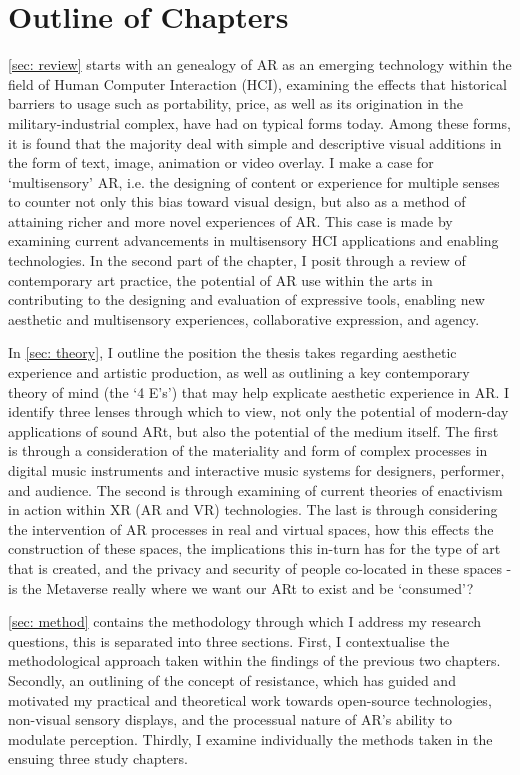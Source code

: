 \section{Outline of Chapters}\label{sec: introduction-outline}
\autoref{sec: review} starts with an genealogy of AR as an emerging technology within the field of Human Computer Interaction (HCI), examining the effects that historical barriers to usage such as portability, price, as well as its origination in the military-industrial complex, have had on typical forms today. Among these forms, it is found that the majority deal with simple and descriptive visual additions in the form of text, image, animation or video overlay. I make a case for `multisensory' AR, i.e. the designing of content or experience for multiple senses to counter not only this bias toward visual design, but also as a method of attaining richer and more novel experiences of AR. This case is made by examining current advancements in multisensory HCI applications and enabling technologies. In the second part of the chapter, I posit through a review of contemporary art practice, the potential of AR use within the arts in contributing to the designing and evaluation of expressive tools, enabling new aesthetic and multisensory experiences, collaborative expression, and agency.

In \autoref{sec: theory}, I outline the position the thesis takes regarding aesthetic experience and artistic production, as well as outlining a key contemporary theory of mind (the `4 E's') that may help explicate aesthetic experience in AR. I identify three lenses through which to view, not only the potential of modern-day applications of sound ARt, but also the potential of the medium itself. The first is through a consideration of the materiality and form of complex processes in digital music instruments and interactive music systems for designers, performer, and audience. The second is through examining of current theories of enactivism in action within XR (AR and VR) technologies. The last is through considering the intervention of AR processes in real and virtual spaces, how this effects the construction of these spaces, the implications this in-turn has for the type of art that is created, and the privacy and security of people co-located in these spaces - is the Metaverse really where we want our ARt to exist and be `consumed'? 

\autoref{sec: method} contains the methodology through which I address my research questions, this is separated into three sections. First, I contextualise the methodological approach taken within the findings of the previous two chapters. Secondly, an outlining of the concept of resistance, which has guided and motivated my practical and theoretical work towards open-source technologies, non-visual sensory displays, and the processual nature of AR's ability to modulate perception. Thirdly, I examine individually the methods taken in the ensuing three study chapters.
 
